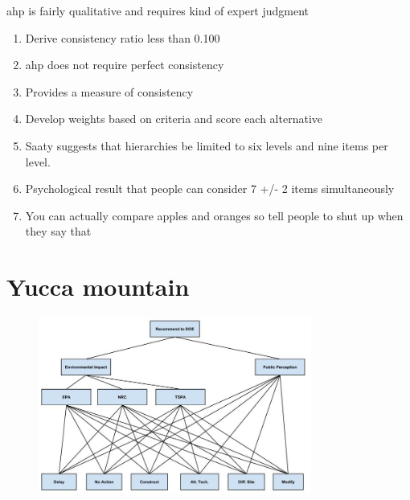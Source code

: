 \documentclass[aspectratio=1610,pdftex,dvipsnames,compress,xcolor={dvipsnames}]{beamer}
\newcommand{\acs}{\acrshort} %
\begin{document}
\begin{frame}{\acs{ahp} is fairly qualitative and requires kind of expert judgment}
    \begin{enumerate}[series=outerlist,topsep=0pt,itemsep=11pt,leftmargin=*,label=(\arabic*)]
        \item[]Derive consistency ratio less than 0.100
        \item[]\acs{ahp} does not require perfect consistency  
        \item[]Provides a measure of consistency
        \item[]Develop weights based on criteria and score each alternative
        \item[]Saaty suggests that hierarchies be limited to six levels and nine items per level.  
        \item[]Psychological result that people can consider 7 +/- 2 items simultaneously
        \item[]You can actually compare apples and oranges so tell people to shut up when they say that
    \end{enumerate}
\end{frame}


\section{Yucca mountain}


\addtocounter{framenumber}{-1}
\begin{frame}{}
    \begin{figure}
        \centering
        \includegraphics[width=0.80\textwidth]{ahp_first.try.jpg}
    \end{figure}
\end{frame}
\end{document}
